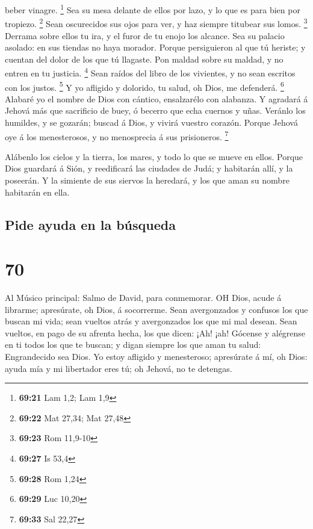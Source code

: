 beber vinagre. \footnote{\textbf{69:21} Lam 1,2; Lam 1,9} 
Sea su mesa delante de ellos por lazo, y lo que es para bien por
tropiezo. \footnote{\textbf{69:22} Mat 27,34; Mat 27,48} 
Sean oscurecidos sus ojos para ver, y haz siempre titubear sus lomos.
\footnote{\textbf{69:23} Rom 11,9-10}  Derrama sobre ellos
tu ira, y el furor de tu enojo los alcance.  Sea su palacio
asolado: en sus tiendas no haya morador.  Porque
persiguieron al que tú heriste; y cuentan del dolor de los que tú
llagaste.  Pon maldad sobre su maldad, y no entren en tu
justicia. \footnote{\textbf{69:27} Is 53,4}  Sean raídos
del libro de los vivientes, y no sean escritos con los justos.
\footnote{\textbf{69:28} Rom 1,24}  Y yo afligido y
dolorido, tu salud, oh Dios, me defenderá. \footnote{\textbf{69:29} Luc
  10,20}  Alabaré yo el nombre de Dios con cántico,
ensalzarélo con alabanza.  Y agradará á Jehová más que
sacrificio de buey, ó becerro que echa cuernos y uñas. 
Veránlo los humildes, y se gozarán; buscad á Dios, y vivirá vuestro
corazón.  Porque Jehová oye á los menesterosos, y no
menosprecia á sus prisioneros. \footnote{\textbf{69:33} Sal 22,27}

 Alábenlo los cielos y la tierra, los mares, y todo lo que
se mueve en ellos.  Porque Dios guardará á Sión, y
reedificará las ciudades de Judá; y habitarán allí, y la poseerán.
 Y la simiente de sus siervos la heredará, y los que aman
su nombre habitarán en ella.

\hypertarget{pide-ayuda-en-la-buxfasqueda}{%
\subsection{Pide ayuda en la
búsqueda}\label{pide-ayuda-en-la-buxfasqueda}}

\hypertarget{section-69}{%
\section{70}\label{section-69}}

 Al Músico principal: Salmo de David, para conmemorar. OH
Dios, acude á librarme; apresúrate, oh Dios, á socorrerme. 
Sean avergonzados y confusos los que buscan mi vida; sean vueltos atrás
y avergonzados los que mi mal desean.  Sean vueltos, en pago
de su afrenta hecha, los que dicen: ¡Ah! ¡ah!  Gócense y
alégrense en ti todos los que te buscan; y digan siempre los que aman tu
salud: Engrandecido sea Dios.  Yo estoy afligido y
menesteroso; apresúrate á mí, oh Dios: ayuda mía y mi libertador eres
tú; oh Jehová, no te detengas.

